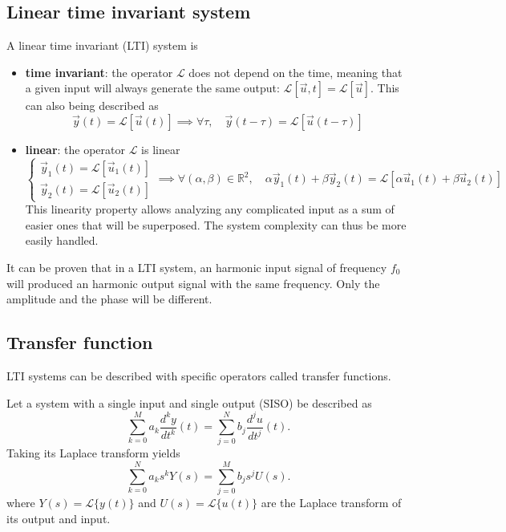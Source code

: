 \subsection{Linear time invariant system}
A linear time invariant (LTI) system is 
\begin{itemize}
	\item \textbf{time invariant}: the operator $\mathcal{L}$ does not depend on the time, meaning that a given input will always generate the same output: $\mathcal{L}[\vec{u},t]=\mathcal{L}[\vec{u}]$. This can also being described as
	\begin{equation}
		\vec{y}(t) = \mathcal{L}[\vec{u}(t)] \implies \forall \tau, \quad \vec{y}(t-\tau) = \mathcal{L}[\vec{u}(t-\tau)]
	\end{equation}
	\item \textbf{linear}: 	the operator  $\mathcal{L}$ is linear
	\begin{equation}
		\begin{cases}
			\vec{y}_1(t) = \mathcal{L}[\vec{u}_1(t)] \\
			\vec{y}_2(t) = \mathcal{L}[\vec{u}_2(t)] 
		\end{cases}
		\implies \forall (\alpha, \beta) \in \mathbb{R}^2, \quad
		\alpha \vec{y}_1(t) + \beta \vec{y}_2(t) = \mathcal{L}[\alpha\vec{u}_1(t)+\beta\vec{u}_2(t)]
	\end{equation}
	This linearity property allows analyzing any complicated input as a sum of easier ones that will be superposed. The system complexity can thus be more easily handled.
\end{itemize}

It can be proven that in a LTI system, an harmonic input signal of frequency $f_0$ will produced an harmonic output signal with the same frequency. Only the amplitude and the phase will be different.

\subsection{Transfer function}
LTI systems can be described with specific operators called transfer functions.

Let a system with a single input and single output (SISO) be described as 
\begin{equation}
	\label{eq:controlth_diff_eq}
	\sum\limits_{k=0}^M a_k \frac{d^k y}{dt^k}(t) = \sum\limits_{j=0}^N b_j \frac{d^j u}{dt^j}(t).
\end{equation}
Taking its Laplace transform yields
\begin{equation}
\sum\limits_{k=0}^N a_k s^k Y(s) = \sum\limits_{j=0}^M b_j s^j U(s).
\end{equation}
where $Y(s) = \mathcal{L}\{y(t)\}$ and $U(s) = \mathcal{L}\{u(t)\}$ are the Laplace transform of its output and input.

